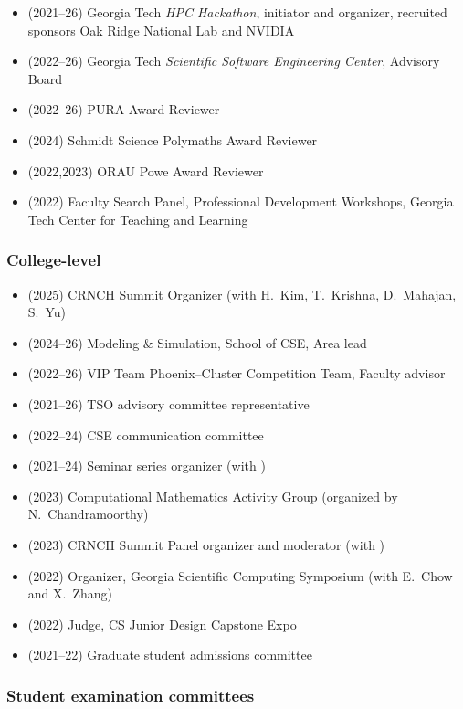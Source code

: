 \begin{itemize}
    \item (2021--26) Georgia Tech \textit{HPC Hackathon}, initiator and organizer, recruited sponsors Oak Ridge National Lab and NVIDIA 
    \item (2022--26) Georgia Tech \textit{Scientific Software Engineering Center}, Advisory Board
    \item (2022--26) PURA Award Reviewer
    \item (2024) Schmidt Science Polymaths Award Reviewer
    \item (2022,2023) ORAU Powe Award Reviewer
    \item (2022) Faculty Search Panel, Professional Development Workshops, Georgia Tech Center for Teaching and Learning
\end{itemize}

\subsubsection{College-level}

\begin{itemize}
    \item (2025) CRNCH Summit Organizer (with H.~Kim, T.~Krishna, D.~Mahajan, S.~Yu)
    \item (2024--26) Modeling \& Simulation, School of CSE, Area lead
    \item (2022--26) VIP Team Phoenix--Cluster Competition Team, Faculty advisor
    \item (2021--26) TSO advisory committee representative
    \item (2022--24) CSE communication committee
    \item (2021--24) Seminar series organizer (with \Florian)
    \item (2023) Computational Mathematics Activity Group (organized by N.~Chandramoorthy)
    \item (2023) CRNCH Summit Panel organizer and moderator (with \Rich)
    \item (2022) Organizer, Georgia Scientific Computing Symposium (with E.~Chow and X.~Zhang)
    \item (2022) Judge, CS Junior Design Capstone Expo
    \item (2021--22) Graduate student admissions committee
\end{itemize}

\subsubsection{Student examination committees}

